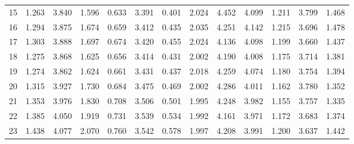 \begin{tabular}{lrrrrrrrrrrrr}
	15                  & 1.263                          & 3.840                        & 1.596                        & 0.633                      & 3.391 & 0.401     & 2.024         & 4.452 & 4.099     & 1.211         & 3.799 & 1.468     \\
	16                  & 1.294                          & 3.875                        & 1.674                        & 0.659                      & 3.412 & 0.435     & 2.035         & 4.251 & 4.142     & 1.215         & 3.696 & 1.478     \\
	17                  & 1.303                          & 3.888                        & 1.697                        & 0.674                      & 3.420 & 0.455     & 2.024         & 4.136 & 4.098     & 1.199         & 3.660 & 1.437     \\
	18                  & 1.275                          & 3.868                        & 1.625                        & 0.656                      & 3.414 & 0.431     & 2.002         & 4.190 & 4.008     & 1.175         & 3.714 & 1.381     \\
	19                  & 1.274                          & 3.862                        & 1.624                        & 0.661                      & 3.431 & 0.437     & 2.018         & 4.259 & 4.074     & 1.180         & 3.754 & 1.394     \\
	20                  & 1.315                          & 3.927                        & 1.730                        & 0.684                      & 3.475 & 0.469     & 2.002         & 4.286 & 4.011     & 1.162         & 3.780 & 1.352     \\
	21                  & 1.353                          & 3.976                        & 1.830                        & 0.708                      & 3.506 & 0.501     & 1.995         & 4.248 & 3.982     & 1.155         & 3.757 & 1.335     \\
	22                  & 1.385                          & 4.050                        & 1.919                        & 0.731                      & 3.539 & 0.534     & 1.992         & 4.161 & 3.971     & 1.172         & 3.683 & 1.374     \\
	23                  & 1.438                          & 4.077                        & 2.070                        & 0.760                      & 3.542 & 0.578     & 1.997         & 4.208 & 3.991     & 1.200         & 3.637 & 1.442     \\
	\bottomrule
\end{tabular}
